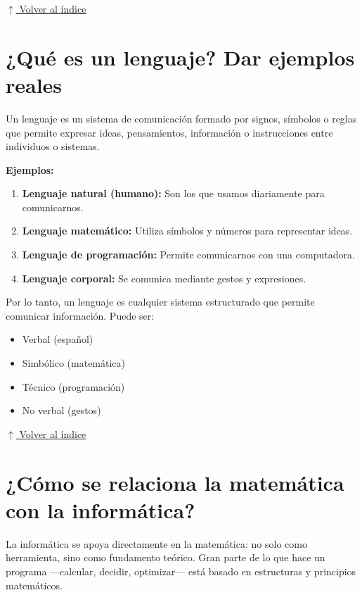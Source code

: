 \documentclass[12pt]{article}
\newcommand{\volverindice}{%
    \vspace{1em}%
    \begin{flushright}%
        \hyperlink{indice}{\small $\uparrow$ Volver al índice}%
    \end{flushright}%
}
\begin{document}
\volverindice
\newpage


\section{¿Qué es un lenguaje? Dar ejemplos reales}

Un lenguaje es un sistema de comunicación formado por signos, símbolos o reglas que permite expresar ideas, pensamientos, información o instrucciones entre individuos o sistemas.

\textbf{Ejemplos:}
\begin{enumerate}
    \item \textbf{Lenguaje natural (humano):} Son los que usamos diariamente para comunicarnos.
    \item \textbf{Lenguaje matemático:} Utiliza símbolos y números para representar ideas.
    \item \textbf{Lenguaje de programación:} Permite comunicarnos con una computadora.
    \item \textbf{Lenguaje corporal:} Se comunica mediante gestos y expresiones.
\end{enumerate}

Por lo tanto, un lenguaje es cualquier sistema estructurado que permite comunicar información. Puede ser:

\begin{itemize}
    \item Verbal (español)
    \item Simbólico (matemática)
    \item Técnico (programación)
    \item No verbal (gestos)
\end{itemize}

\volverindice
\newpage


\section{¿Cómo se relaciona la matemática con la informática?}

La informática se apoya directamente en la matemática: no solo como herramienta, sino como fundamento teórico. Gran parte de lo que hace un programa —calcular, decidir, optimizar— está basado en estructuras y principios matemáticos.
\end{document}
